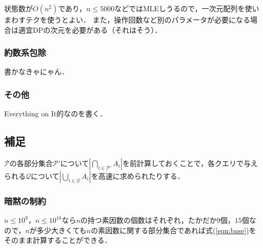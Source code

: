 \documentclass{jsarticle}
\begin{document}
状態数が$O(n^2)$であり，$n\le 5000$などではMLEしうるので，一次元配列を使いまわすテクを使うとよい．
また，操作回数など別のパラメータが必要になる場合は適宜DPの次元を必要がある（それはそう）．

\subsubsection{約数系包除}
書かなきゃにゃん．

\subsubsection{その他}
Everything on It的なのを書く．

\subsection{補足}
$\mathcal{P}$の各部分集合$\mathcal{P}'$について$\left|\bigcap_{i\in\mathcal{P}'} A_i\right|$を前計算しておくことで，各クエリで与えられる$\mathcal{Q}$について$\left|\bigcup_{i\in\mathcal{Q}} A_i\right|$を高速に求められたりする．

\subsubsection{暗黙の制約}
$n\le 10^9$，$n\le 10^{18}$なら$n$の持つ素因数の個数はそれぞれ，たかだか$9$個，$15$個なので，$n$が多少大きくても$n$の素因数に関する部分集合であれば式(\ref{eqn:base})をそのまま計算することができる．
\end{document}
